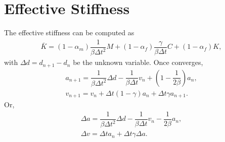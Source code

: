 \documentclass[a4paper,10pt,fleqn]{article}
\begin{document}
\section{Effective Stiffness}
The effective stiffness can be computed as
\begin{gather}
\bar{K}=\left(1-\alpha_m\right)\dfrac{1}{\beta\Delta{}t^2}M+\left(1-\alpha_f\right)\dfrac{\gamma}{\beta\Delta{}t}C+\left(1-\alpha_f\right)K,
\end{gather}
with $\Delta{}d=d_{n+1}-d_n$ be the unknown variable. Once converges,
\begin{gather}
a_{n+1}=\dfrac{1}{\beta\Delta{}t^2}\Delta{}d-\dfrac{1}{\beta\Delta{}t}v_n+\left(1-\dfrac{1}{2\beta}\right)a_n,\\
v_{n+1}=v_n+\Delta{}t\left(1-\gamma\right)a_n+\Delta{}t\gamma{}a_{n+1}.
\end{gather}
Or,
\begin{gather}
\Delta{}a=\dfrac{1}{\beta\Delta{}t^2}\Delta{}d-\dfrac{1}{\beta\Delta{}t}v_n-\dfrac{1}{2\beta}a_n,\\
\Delta{}v=\Delta{}ta_n+\Delta{}t\gamma{}\Delta{}a.
\end{gather}
\end{document}
